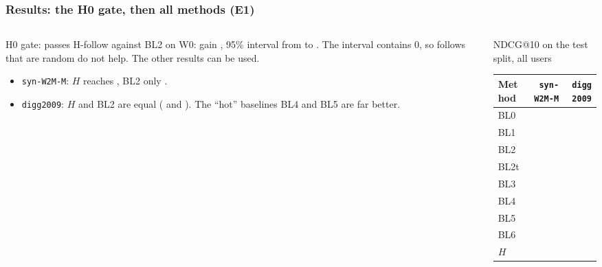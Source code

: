 \documentclass[aspectratio=169,11pt]{beamer}
\begin{document}
\begin{frame}
  \frametitle{Results: the H0 gate, then all methods (E1)}
  \begin{columns}[T]
    \begin{column}{0.46\textwidth}
      \begin{block}{H0 gate: passes}
        \small H-follow against BL2 on W0: gain \hZeroWZeroNdcgHFollowTenAllGain{}, 95\% interval from \hZeroWZeroNdcgHFollowTenAllCiLow{} to \hZeroWZeroNdcgHFollowTenAllCiHigh{}. The interval contains 0, so follows that are random do not help. The other results can be used.
      \end{block}
      \begin{itemize}\small
        \item \texttt{syn-W2M-M}: $H$ reaches \eOneWTwoMNdcgHTenAllValue{}, BL2 only \eOneWTwoMNdcgBLTwoTenAllValue{}.
        \item \texttt{digg2009}: $H$ and BL2 are equal (\eOneDiggNdcgHTenAllValue{} and \eOneDiggNdcgBLTwoTenAllValue{}). The ``hot'' baselines BL4 and BL5 are far better.
      \end{itemize}
    \end{column}
    \begin{column}{0.50\textwidth}
      \centering
      \small NDCG@10 on the test split, all users\\[1mm]
      \footnotesize
      \begin{tabular}{lrr}
        \toprule
        Method & \texttt{syn-W2M-M} & \texttt{digg2009} \\
        \midrule
        BL0  & \eOneWTwoMNdcgBLZeroTenAllValue{}  & \eOneDiggNdcgBLZeroTenAllValue{} \\
        BL1  & \eOneWTwoMNdcgBLOneTenAllValue{}   & \eOneDiggNdcgBLOneTenAllValue{} \\
        BL2  & \eOneWTwoMNdcgBLTwoTenAllValue{}   & \eOneDiggNdcgBLTwoTenAllValue{} \\
        BL2t & \eOneWTwoMNdcgBLTwoTTenAllValue{}  & \eOneDiggNdcgBLTwoTTenAllValue{} \\
        BL3  & \eOneWTwoMNdcgBLThreeTenAllValue{} & \eOneDiggNdcgBLThreeTenAllValue{} \\
        BL4  & \eOneWTwoMNdcgBLFourTenAllValue{}  & \eOneDiggNdcgBLFourTenAllValue{} \\
        BL5  & \eOneWTwoMNdcgBLFiveTenAllValue{}  & \eOneDiggNdcgBLFiveTenAllValue{} \\
        BL6  & \eOneWTwoMNdcgBLSixTenAllValue{}   & \eOneDiggNdcgBLSixTenAllValue{} \\
        \midrule
        $H$  & \textbf{\eOneWTwoMNdcgHTenAllValue{}} & \textbf{\eOneDiggNdcgHTenAllValue{}} \\
        \bottomrule
      \end{tabular}
    \end{column}
  \end{columns}
\end{frame}
\end{document}
